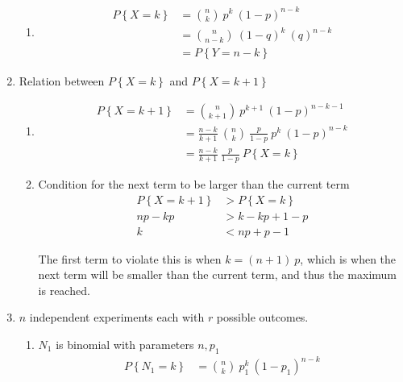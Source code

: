 \begin{enumerate}
\begin{enumerate}
			\item \begin{align}
				P \left\{X  = k\right\} &= \binom{n}{k} \ p^k \ (1-p)^{n-k} \nonumber \\
				&= \binom{n}{n-k} \ (1-q)^k \ (q)^{n-k} \nonumber \\
				&= P \left\{Y  = n-k\right\}
			\end{align}
		\end{enumerate}
	
	
	\item Relation between $ P \left\{X  = k\right\} $ and $ P \left\{X  = k+1\right\} $\\
	
		\begin{enumerate}
			\item \begin{align}
				P \left\{X = k+1 \right\} &= \binom{n}{k+1} \ p^{k+1} \ (1-p)^{n-k-1} \\
				&= \frac{n-k}{k+1}\ \binom{n}{k}\ \frac{p}{1-p} \ p^{k} \ (1-p)^{n-k} \nonumber \\
				&= \frac{n-k}{k+1}\ \frac{p}{1-p}\ P \left\{X = k \right\}
			\end{align}
			
			\item Condition for the next term to be larger than the current term \\
			\begin{align}
				P \left\{X = k+1 \right\} &> P \left\{X = k \right\} \nonumber \\
				np - kp &> k - kp + 1 - p \nonumber \\
				k &< np + p - 1
			\end{align}
			
			The first term to violate this is when $ k = (n+1)\ p $, which is when the next term will be smaller than the current term, and thus the maximum is reached.
			
		\end{enumerate}
	 
	
	\item $ n $ independent experiments each with $ r $ possible outcomes.
	
		\begin{enumerate}
			\item $ N_1 $ is binomial with parameters $ n, p_1 $
			\begin{align}
				P \left\{N_1 = k\right\} &= \binom{n}{k}\ p_1^k\ (1-p_1)^{n-k}
			\end{align}
			

\end{enumerate}
\end{enumerate}
